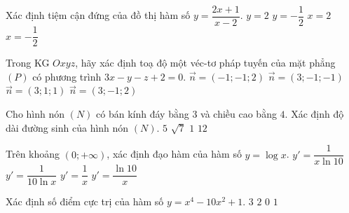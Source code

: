 \begin{ex}%
Xác định tiệm cận đứng của đồ thị hàm số $y=\dfrac{2x+1}{x-2}$.
\choice
{$y=2$}
{$y=-\dfrac{1}{2}$}
{\True $x=2$}
{$x=-\dfrac{1}{2}$}
\end{ex}
\begin{ex}%
	Trong KG $Oxyz$, hãy xác định toạ độ một véc-tơ pháp tuyến của mặt phẳng $(P)$ có phương trình $3x-y-z+2=0$.
	\choice
	{$\vec{n}=(-1;-1;2)$}
	{\True $\vec{n}=(3;-1;-1)$}
	{$\vec{n}=(3;1;1)$}
	{$\vec{n}=(3;-1;2)$}
\end{ex}
\begin{ex}%
	Cho hình nón $(N)$ có bán kính đáy bằng $3$ và chiều cao bằng $4$. Xác định độ dài đường sinh của hình nón $(N)$.
	\choice
	{\True $5$}
	{$\sqrt{7}$}
	{$1$}
	{$12$}
\end{ex}
\begin{ex}%
	Trên khoảng $(0;+\infty)$, xác định đạo hàm của hàm số $y=\log x$.
	\choice
	{\True $y'=\dfrac{1}{x \ln 10}$}
	{$y'=\dfrac{1}{10 \ln x}$}
	{$y'=\dfrac{1}{x}$}
	{$y'=\dfrac{\ln 10}{x}$}
\end{ex}
\begin{ex}%
	Xác định số điểm cực trị của hàm số $y=x^4-10x^2+1$.
	\choice
	{\True $3$}
	{$2$}
	{$0$}
	{$1$}
\end{ex}

